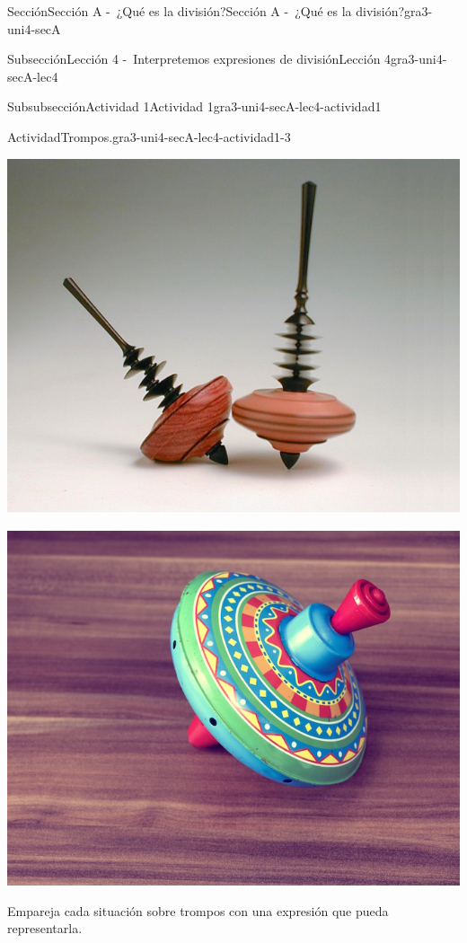 \documentclass[twoside,10pt,]{article}
\begin{document}
\begin{sectionptx}{Sección}{Sección A -~¿Qué es la división?}{}{Sección A -~¿Qué es la división?}{}{}{gra3-uni4-secA}
\begin{subsectionptx}{Subsección}{Lección 4 -~Interpretemos expresiones de división}{}{Lección 4}{}{}{gra3-uni4-secA-lec4}
\begin{subsubsectionptx}{Subsubsección}{Actividad 1}{}{Actividad 1}{}{}{gra3-uni4-secA-lec4-actividad1}
\begin{activity}{Actividad}{Trompos.}{gra3-uni4-secA-lec4-actividad1-3}
\begin{sidebyside}{5}{0}{0}{0}
\begin{sbspanel}{0.2}
\includegraphics[width=\linewidth]{external/png-source/V1 3.4.A.4 German Kreisel Copy.png}
\end{sbspanel}%
\begin{sbspanel}{0.2}%
\includegraphics[width=\linewidth]{external/jpg-source/V1 3.4.A.4 Colorful Top.jpg}
\end{sbspanel}%
\end{sidebyside}%
\par
Empareja cada situación sobre trompos con una expresión que pueda representarla.%
\begin{sidebyside}{2}{0.05}{0}{0.15}%
\begin{sbspanel}{0.6}%

\end{sbspanel}
\end{sidebyside}
\end{activity}
\end{subsubsectionptx}
\end{subsectionptx}
\end{sectionptx}
\end{document}
